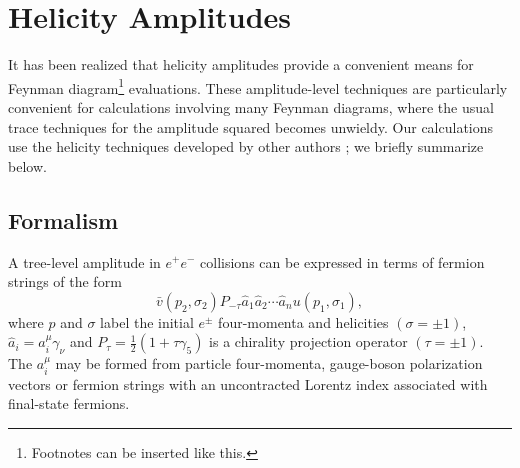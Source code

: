\documentclass[manuscript]{../aastex52/aastex}
\begin{document}

\section{Helicity Amplitudes}

It has been realized that helicity amplitudes provide a convenient means
for Feynman diagram\footnote{Footnotes can be inserted like this.}
evaluations.  These amplitude-level techniques
are particularly convenient for calculations involving many Feynman
diagrams, where the usual trace techniques for the amplitude
squared becomes unwieldy.  Our calculations use the helicity techniques
developed by other authors \cite[]{hag86}; we briefly summarize below.

\subsection{Formalism} \label{bozomath}


A tree-level amplitude in $e^+e^-$ collisions can be expressed in
terms of fermion strings of the form
\begin{equation}
\bar v(p_2,\sigma_2)P_{-\tau}\hat a_1\hat a_2\cdots
\hat a_nu(p_1,\sigma_1) ,
\end{equation}
where $p$ and $\sigma$ label the initial $e^{\pm}$ four-momenta
and helicities $(\sigma = \pm 1)$, $\hat a_i=a^\mu_i\gamma_\nu$
and $P_\tau=\frac{1}{2}(1+\tau\gamma_5)$ is a chirality projection
operator $(\tau = \pm1)$.  The $a^\mu_i$ may be formed from particle
four-momenta, gauge-boson polarization vectors or fermion strings with
an uncontracted Lorentz index associated with final-state fermions.


\end{document}
